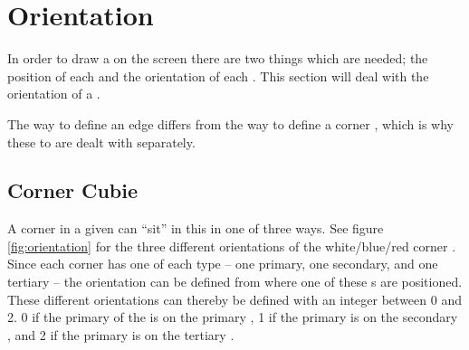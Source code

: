 \section{Orientation}
In order to draw a \rubik{} on the screen there are two things which are needed; the position of each \cubie{} and the orientation of each \cubie{}. This section will deal with the orientation of a \cubie{}.

The way to define an edge \cubie{} differs from the way to define a corner \cubie{}, which is why these to are dealt with separately.

\subsection{Corner Cubie}
A corner \cubie{} in a given \cubicle{} can ``sit'' in this \cubicle{} in one of three ways. See figure \ref{fig:orientation} for the three different orientations of the white/blue/red corner \cubie{}.
Since each corner \cubie{} has one of each \facelet{} type -- one primary, one secondary, and one tertiary -- the orientation can be defined from where one of these \facelet{}s are positioned.
These different orientations can thereby be defined with an integer between 0 and 2.
0 if the primary \facelet{} of the \cubie{} is on the primary \face{}, 1 if the primary \facelet{} is on the secondary \face{}, and 2 if the primary \facelet{} is on the tertiary \face{}.

